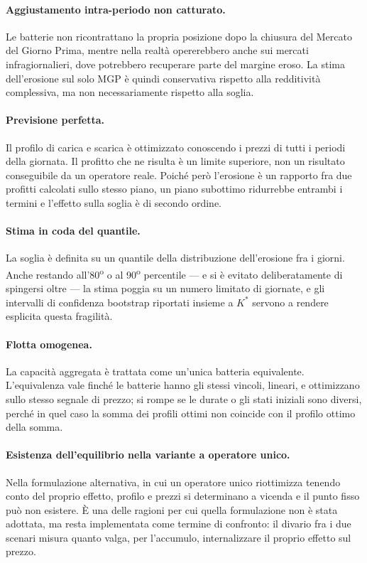 \paragraph{Aggiustamento intra-periodo non catturato.} Le batterie non ricontrattano la
propria posizione dopo la chiusura del Mercato del Giorno Prima, mentre nella realt\`a
opererebbero anche sui mercati infragiornalieri, dove potrebbero recuperare parte del margine
eroso. La stima dell'erosione sul solo MGP \`e quindi conservativa rispetto alla redditivit\`a
complessiva, ma non necessariamente rispetto alla soglia.

\paragraph{Previsione perfetta.} Il profilo di carica e scarica \`e ottimizzato conoscendo i
prezzi di tutti i periodi della giornata. Il profitto che ne risulta \`e un limite superiore,
non un risultato conseguibile da un operatore reale. Poich\'e per\`o l'erosione \`e un rapporto
fra due profitti calcolati sullo stesso piano, un piano subottimo ridurrebbe entrambi i
termini e l'effetto sulla soglia \`e di secondo ordine.

\paragraph{Stima in coda del quantile.} La soglia \`e definita su un quantile della
distribuzione dell'erosione fra i giorni. Anche restando all'80\textsuperscript{o} o al
90\textsuperscript{o} percentile — e si \`e evitato deliberatamente di spingersi oltre — la
stima poggia su un numero limitato di giornate, e gli intervalli di confidenza bootstrap
riportati insieme a $K^*$ servono a rendere esplicita questa fragilit\`a.

\paragraph{Flotta omogenea.} La capacit\`a aggregata \`e trattata come un'unica batteria
equivalente. L'equivalenza vale finch\'e le batterie hanno gli stessi vincoli, lineari, e
ottimizzano sullo stesso segnale di prezzo; si rompe se le durate o gli stati iniziali sono
diversi, perch\'e in quel caso la somma dei profili ottimi non coincide con il profilo ottimo
della somma.

\paragraph{Esistenza dell'equilibrio nella variante a operatore unico.} Nella formulazione
alternativa, in cui un operatore unico riottimizza tenendo conto del proprio effetto, profilo
e prezzi si determinano a vicenda e il punto fisso pu\`o non esistere. \`E una delle ragioni
per cui quella formulazione non \`e stata adottata, ma resta implementata come termine di
confronto: il divario fra i due scenari misura quanto valga, per l'accumulo, internalizzare
il proprio effetto sul prezzo.

